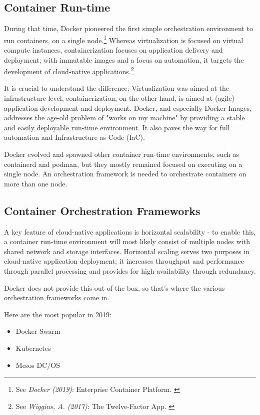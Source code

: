 \subsection{Container Run-time}

During that time, Docker pioneered the first simple orchestration environment to run containers, on a single node.\footnote{See \textit{Docker (2019)}: Enterprise Container Platform. \cite{docker}} Whereas virtualization is focused on virtual compute instances, containerization focuses on application delivery and deployment; with immutable images and a focus on automation, it targets the development of cloud-native applications.\footnote{See \textit{Wiggins, A. (2017)}: The Twelve-Factor App. \cite{12factor}}

It is crucial to understand the difference: Virtualization was aimed at the infrastructure level, containerization, on the other hand, is aimed at (agile) application development and deployment. Docker, and especially Docker Images, addresses the age-old problem of "works on my machine" by providing a stable and easily deployable run-time environment. It also paves the way for full automation and Infrastructure as Code (IaC).

Docker evolved and spawned other container run-time environments, such as containerd and podman, but they mostly remained focused on executing on a single node. An orchestration framework is needed to orchestrate containers on more than one node. 

\subsection{Container Orchestration Frameworks}

A key feature of cloud-native applications is horizontal scalability - to enable this, a container run-time environment will most likely consist of multiple nodes with shared network and storage interfaces. Horizontal scaling serves two purposes in cloud-native application deployment; it increases throughput and performance through parallel processing and provides for high-availability through redundancy.

Docker does not provide this out of the box, so that's where the various orchestration frameworks come in. 

Here are the most popular in 2019:
\begin{itemize}
\item Docker Swarm
\item Kubernetes
\item Mesos DC/OS
\end{itemize}

